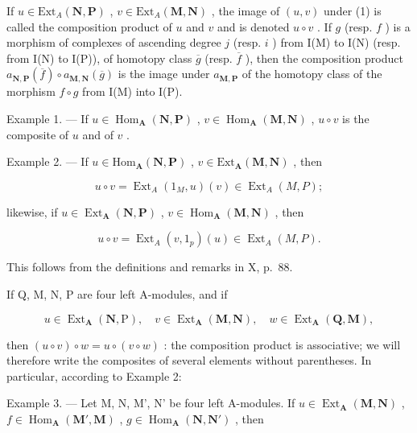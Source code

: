 If \(u \in \text{Ext}_A(\mathbf{N}, \mathbf{P})\) , \(v \in \text{Ext}_A(\mathbf{M}, \mathbf{N})\) , the image of \((u, v)\) under (1) is called the composition product of \(u\) and \(v\) and is denoted \(u \circ v\) . If \(g\) (resp. \(f\) ) is a morphism of complexes of ascending degree \(j\) (resp. \(i\) ) from I(M) to I(N) (resp. from I(N) to I(P)), of homotopy class \(\overline{g}\) (resp. \(\overline{f}\) ), then the composition product \(a_{\mathbf{N},\mathbf{P}}(\overline{f}) \circ a_{\mathbf{M},\mathbf{N}}(\overline{g})\) is the image under \(a_{\mathbf{M},\mathbf{P}}\) of the homotopy class of the morphism \(f \circ g\) from I(M) into I(P).

Example 1. --- If \(u \in \operatorname{Hom}_{\mathbf{A}}(\mathbf{N}, \mathbf{P})\) , \(v \in \operatorname{Hom}_{\mathbf{A}}(\mathbf{M}, \mathbf{N})\) , \(u \circ v\) is the composite of \(u\) and of \(v\) .

Example 2. --- If \(u \in \mathrm{Hom}_{\mathbf{A}}(\mathbf{N}, \mathbf{P})\) , \(v \in \mathrm{Ext}_{\mathbf{A}}(\mathbf{M}, \mathbf{N})\) , then

\[
u \circ v = \operatorname{Ext} _ {A} (1 _ {M}, u) (v) \in \operatorname{Ext} _ {A} (M, P);
\]

likewise, if \(u \in \operatorname{Ext}_{\mathbf{A}}(\mathbf{N}, \mathbf{P})\) , \(v \in \operatorname{Hom}_{\mathbf{A}}(\mathbf{M}, \mathbf{N})\) , then

\[
u \circ v = \operatorname{Ext} _ {A} (v, 1 _ {p}) (u) \in \operatorname{Ext} _ {A} (M, P).
\]

This follows from the definitions and remarks in X, p.~88.

If Q, M, N, P are four left A-modules, and if

\[
u \in \operatorname{Ext} _ {\mathbf {A}} (\mathbf {N}, \mathrm{P}), \quad v \in \operatorname{Ext} _ {\mathbf {A}} (\mathbf {M}, \mathbf {N}), \quad w \in \operatorname{Ext} _ {\mathbf {A}} (\mathbf {Q}, \mathbf {M}),
\]

then \((u \circ v) \circ w = u \circ (v \circ w)\) : the composition product is associative; we will therefore write the composites of several elements without parentheses. In particular, according to Example 2:

Example 3. — Let M, N, M', N' be four left A-modules. If \(u \in \operatorname{Ext}_{\mathbf{A}}(\mathbf{M}, \mathbf{N})\) , \(f \in \operatorname{Hom}_{\mathbf{A}}(\mathbf{M}', \mathbf{M})\) , \(g \in \operatorname{Hom}_{\mathbf{A}}(\mathbf{N}, \mathbf{N}')\) , then

